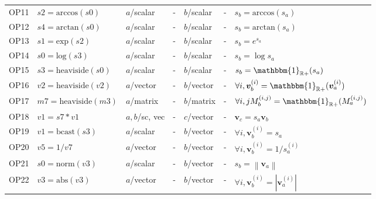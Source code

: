 \documentclass[11pt,oneside,openany,report]{jsbook}
\begin{document}
\begin{center}
{{\begin{longtable}{l|l|lc|lc|l}
        OP11 & $s2 = \mathrm{arccos}(s0)$                 & $a$/scalar              & -               & $b$/scalar & -     & $s_b = \mathrm{arccos}(s_a)$                                                   \\
        OP12 & $s4 = \mathrm{arctan}(s0)$                 & $a$/scalar              & -               & $b$/scalar & -     & $s_b = \mathrm{arctan}(s_a)$                                                   \\
        OP13 & $s1 = \mathrm{exp}(s2)$                    & $a$/scalar              & -               & $b$/scalar & -     & $s_b = e^{s_a}$                                                                \\
        OP14 & $s0 = \mathrm{log}(s3)$                    & $a$/scalar              & -               & $b$/scalar & -     & $s_b = \log s_a$                                                               \\
        OP15 & $s3 = \mathrm{heaviside}(s0)$              & $a$/scalar              & -               & $b$/scalar & -     & $s_b = \mathbbm{1}_{\mathbb{R}+}(s_a)$                                         \\
        OP16 & $v2 = \mathrm{heaviside}(v2)$              & $a$/vector              & -               & $b$/vector & -     & $\forall i,\bm{v}_b^{(i)} = \mathbbm{1}_{\mathbb{R}+}(\bm{v}_a^{(i)})$         \\
        OP17 & $m7 = \mathrm{heaviside}(m3)$              & $a$/matrix              & -               & $b$/matrix & -     & $\forall i, jM_b^{(i, j)} = \mathbbm{1}_{\mathbb{R}+}(M_a^{(i, j)})$           \\
        OP18 & $v1 = s7 * v1$                             & $a,b$/sc, vec           & -               & $c$/vector & -     & $\bm{v}_c = s_a \bm{v}_b$                                                      \\
        OP19 & $v1 = \mathrm{bcast}(s3)$                  & $a$/scalar              & -               & $b$/vector & -     & $ \forall i,\bm{v}_b^{(i)} = s_a $                                             \\
        OP20 & $v5 = 1/v7$                                & $a$/vector              & -               & $b$/vector & -     & $ \forall i,\bm{v}_b^{(i)} = 1/s_a^{(i)} $                                     \\
        OP21 & $s0 = \mathrm{norm}(v3)$                   & $a$/scalar              & -               & $b$/vector & -     & $s_b = \left\| \bm{v}_a \right\|$                                              \\
        OP22 & $v3 = \mathrm{abs}(v3)$                    & $a$/vector              & -               & $b$/vector & -     & $\forall i,\bm{v}_b^{(i)} = \left| \bm{v}_a^{(i)} \right|$                     \\


\end{longtable}}}
\end{center}
\end{document}
